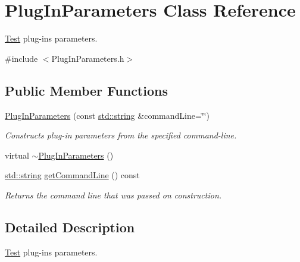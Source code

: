 \hypertarget{class_plug_in_parameters}{\section{Plug\-In\-Parameters Class Reference}
\label{class_plug_in_parameters}
}


\hyperlink{class_test}{Test} plug-\/ins parameters.  




{\ttfamily \#include $<$Plug\-In\-Parameters.\-h$>$}

\subsection*{Public Member Functions}
\begin{DoxyCompactItemize}
\item 
\hyperlink{class_plug_in_parameters_acbf183c92faaa4e17dc66dec87ddc033}{Plug\-In\-Parameters} (const \hyperlink{glew_8h_ae84541b4f3d8e1ea24ec0f466a8c568b}{std\-::string} \&command\-Line=\char`\"{}\char`\"{})
\begin{DoxyCompactList}\small\item\em Constructs plug-\/in parameters from the specified command-\/line. \end{DoxyCompactList}\item 
virtual \hyperlink{class_plug_in_parameters_a5ac0468db723ca7066662388e55f8f28}{$\sim$\-Plug\-In\-Parameters} ()
\item 
\hyperlink{glew_8h_ae84541b4f3d8e1ea24ec0f466a8c568b}{std\-::string} \hyperlink{class_plug_in_parameters_aad9dfbb3f1745b72154ab6b70948d629}{get\-Command\-Line} () const 
\begin{DoxyCompactList}\small\item\em Returns the command line that was passed on construction. \end{DoxyCompactList}\end{DoxyCompactItemize}


\subsection{Detailed Description}
\hyperlink{class_test}{Test} plug-\/ins parameters. 

